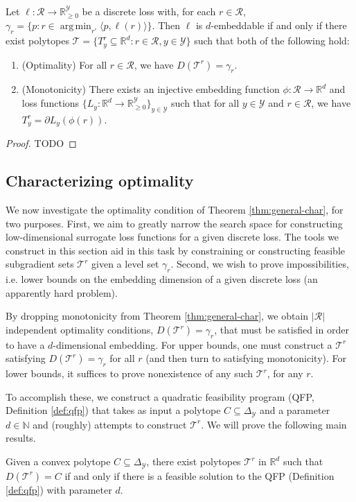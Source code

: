 \documentclass[anon]{colt2020} %
\newcommand{\reals}{\mathbb{R}}
\newcommand{\simplex}{\Delta_\Y}
\newcommand{\R}{\mathcal{R}}
\newcommand{\T}{\mathcal{T}}
\newcommand{\Y}{\mathcal{Y}}
\newcommand{\inprod}[2]{\langle #1, #2 \rangle}%
\DeclareMathOperator*{\argmin}{arg\,min}
\begin{document}
\begin{theorem} \label{thm:general-char}
  Let $\ell: \R \to \reals_{\geq 0}^{\Y}$ be a discrete loss with, for each $r \in \R$, $\gamma_r = \{p : r \in \argmin_{r'} \inprod{p}{\ell(r)}\}$.
  Then $\ell$ is $d$-embeddable if and only if there exist polytopes $\T = \{T^r_y \subseteq \reals^d : r \in \R, y \in \Y\}$ such that both of the following hold:
  \begin{enumerate}
    \item (Optimality) For all $r \in \R$, we have $D(\T^r) = \gamma_r$.
    \item (Monotonicity) There exists an injective embedding function $\phi : \R \to \reals^d$ and loss functions $\{L_y : \reals^d \to \reals^\Y_{\geq 0}\}_{y \in \Y}$ such that for all $y \in \Y$ and $r \in \R$, we have $T^r_y = \partial L_y(\phi(r))$.
  \end{enumerate}
\end{theorem}
\begin{proof}
  TODO
\end{proof}


\subsection{Characterizing optimality}\label{subsec:opt-conditions}

We now investigate the optimality condition of Theorem \ref{thm:general-char}, for two purposes.
First, we aim to greatly narrow the search space for constructing low-dimensional surrogate loss functions for a given discrete loss.
The tools we construct in this section aid in this task by constraining or constructing feasible subgradient sets $\T^r$ given a level set $\gamma_r$.
Second, we wish to prove impossibilities, i.e. lower bounds on the embedding dimension of a given discrete loss (an apparently hard problem).

By dropping monotonicity from Theorem \ref{thm:general-char}, we obtain $|\R|$ independent optimality conditions, $D(\T^r) = \gamma_r$, that must be satisfied in order to have a $d$-dimensional embedding.
For upper bounds, one must construct a $\T^r$ satisfying $D(\T^r) = \gamma_r$ for all $r$ (and then turn to satisfying monotonicity).
For lower bounds, it suffices to prove nonexistence of any such $\T^r$, for any $r$.

To accomplish these, we construct a quadratic feasibility program (QFP, Definition \ref{def:qfp}) that takes as input a polytope $C \subseteq \simplex$ and a parameter $d \in \mathbb{N}$ and (roughly) attempts to construct $\T^r$.
We will prove the following main results.
\begin{theorem} \label{thm:opt-iff-qfp}
  Given a convex polytope $C \subseteq \simplex$, there exist polytopes $\T^r$ in $\reals^d$ such that $D(\T^r) = C$ if and only if there is a feasible solution to the QFP (Definition \ref{def:qfp}) with parameter $d$.
\end{theorem}
\end{document}
